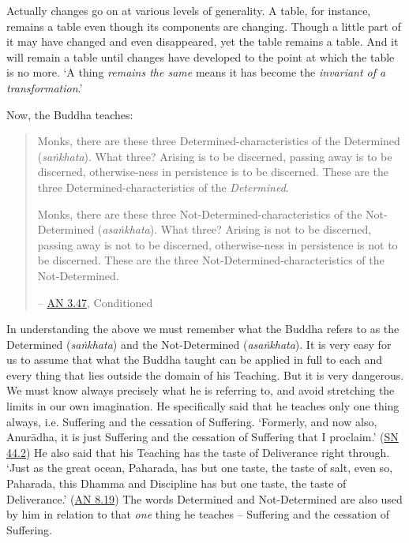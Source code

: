 Actually changes go on at various levels of generality. A table, for instance, remains a table even though its components are changing. Though a little part of it may have changed and even disappeared, yet the table remains a table. And it will remain a table until changes have developed to the point at which the table is no more. `A thing \emph{remains the same} means it has become the \emph{invariant of a transformation}.'

Now, the Buddha teaches:

\begin{quote}
Monks, there are these three Determined-characteristics of the Determined (\textit{saṅkhata}). What three? Arising is to be discerned, passing away is to be discerned, otherwise-ness in persistence is to be discerned. These are the three Determined-characteristics of the \textit{Determined}.

Monks, there are these three Not-Determined-characteristics of the Not-Determined (\textit{asaṅkhata}). What three? Arising is not to be discerned, passing away is not to be discerned, otherwise-ness in persistence is not to be discerned. These are the three Not-Determined-characteristics of the Not-Determined.

 -- \href{https://suttacentral.net/an3.47/en/bodhi}{AN 3.47}, Conditioned
\end{quote}

In understanding the above we must remember what the Buddha refers to as the Determined (\textit{saṅkhata}) and the Not-Determined (\textit{asaṅkhata}). It is very easy for us to assume that what the Buddha taught can be applied in full to each and every thing that lies outside the domain of his Teaching. But it is very dangerous. We must know always precisely what he is referring to, and avoid stretching the limits in our own imagination. He specifically said that he teaches only one thing always, i.e. Suffering and the cessation of Suffering. `Formerly, and now also, Anurādha, it is just Suffering and the cessation of Suffering that I proclaim.' (\href{https://suttacentral.net/sn44.2/en/sujato}{SN 44.2}) He also said that his Teaching has the taste of Deliverance right through. `Just as the great ocean, Paharada, has but one taste, the taste of salt, even so, Paharada, this Dhamma and Discipline has but one taste, the taste of Deliverance.' (\href{https://suttacentral.net/an8.19/en/bodhi}{AN 8.19}) The words Determined and Not-Determined are also used by him in relation to that \emph{one} thing he teaches -- Suffering and the cessation of Suffering.

